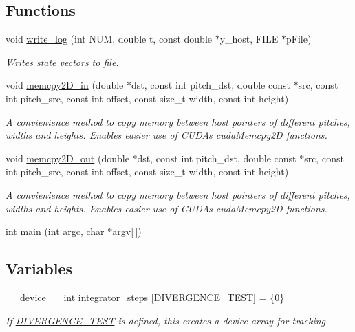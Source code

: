 \subsection*{Functions}
\begin{DoxyCompactItemize}
\item 
void \hyperlink{solver__main_8cu_a4f005e7918ecc7f1cd2424fb1708b2ca}{write\+\_\+log} (int N\+UM, double t, const double $\ast$y\+\_\+host, F\+I\+LE $\ast$p\+File)
\begin{DoxyCompactList}\small\item\em Writes state vectors to file. \end{DoxyCompactList}\item 
void \hyperlink{solver__main_8cu_a8baeaa804b9d16c49da2b8c74fbd6680}{memcpy2\+D\+\_\+in} (double $\ast$dst, const int pitch\+\_\+dst, double const $\ast$src, const int pitch\+\_\+src, const int offset, const size\+\_\+t width, const int height)
\begin{DoxyCompactList}\small\item\em A convienience method to copy memory between host pointers of different pitches, widths and heights. Enables easier use of C\+U\+DA\textquotesingle{}s cuda\+Memcpy2D functions. \end{DoxyCompactList}\item 
void \hyperlink{solver__main_8cu_acfaf06165e3e00cb81ebbcd80ee9c23f}{memcpy2\+D\+\_\+out} (double $\ast$dst, const int pitch\+\_\+dst, double const $\ast$src, const int pitch\+\_\+src, const int offset, const size\+\_\+t width, const int height)
\begin{DoxyCompactList}\small\item\em A convienience method to copy memory between host pointers of different pitches, widths and heights. Enables easier use of C\+U\+DA\textquotesingle{}s cuda\+Memcpy2D functions. \end{DoxyCompactList}\item 
int \hyperlink{solver__main_8cu_a0ddf1224851353fc92bfbff6f499fa97}{main} (int argc, char $\ast$argv\mbox{[}$\,$\mbox{]})
\end{DoxyCompactItemize}
\subsection*{Variables}
\begin{DoxyCompactItemize}
\item 
\+\_\+\+\_\+device\+\_\+\+\_\+ int \hyperlink{solver__main_8cu_a67cdbf6535bef9d8f0227e8340e7fe0a}{integrator\+\_\+steps} \mbox{[}\hyperlink{solver__options_8cuh_afd8c973bc66908100d15f47ae514ed41}{D\+I\+V\+E\+R\+G\+E\+N\+C\+E\+\_\+\+T\+E\+ST}\mbox{]} = \{0\}
\begin{DoxyCompactList}\small\item\em If \hyperlink{solver__options_8cuh_afd8c973bc66908100d15f47ae514ed41}{D\+I\+V\+E\+R\+G\+E\+N\+C\+E\+\_\+\+T\+E\+ST} is defined, this creates a device array for tracking. \end{DoxyCompactList}\end{DoxyCompactItemize}


